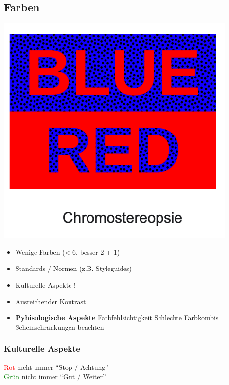 \documentclass[a4paper, landscape, 8pt]{scrartcl}
\begin{document}
\begin{multicols*}{4}
        \subsection{Farben}

        \begin{multicols*}{2}
            \includegraphics[scale=0.15]{graphic/14-chromostereopsie}

            \begin{itemize}
                \item Wenige Farben (< 6, besser 2 + 1)
                \item Standards / Normen (z.B. Styleguides)
                \item Kulturelle Aspekte !
                \item Ausreichender Kontrast
                \item \textbf{Pyhisologische Aspekte}
                \subitem Farbfehlsichtigkeit
                \subitem Schlechte Farbkombis
                \subitem Seheinschränkungen beachten
            \end{itemize}
        \end{multicols*}

        \subsubsection{Kulturelle Aspekte}
        \textcolor{red}{Rot} nicht immer \enquote{Stop / Achtung} \\
        \textcolor{green}{Grün} nicht immer \enquote{Gut / Weiter}


\end{multicols*}
\end{document}

